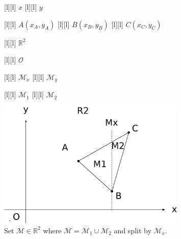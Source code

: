 \begin{figure}[ht!]
	\centering
	\footnotesize

	[l] {$x$}
	[l] {$y$}

	[l] {$A(x_A,y_A)$}
	[l] {$B(x_B,y_B)$}
	[l] {$C(x_C,y_C)$}

	[l] {$\mathbb{R}^2$}

	[l] {$\mathcal{O}$}

	[l] {$\mathcal{M}_x$}
	[l] {$\mathcal{M}_y$}

	[l] {$\mathcal{M}_1$}
	[l] {$\mathcal{M}_2$}

	\includegraphics[width=0.8\textwidth]{setAinR2_Ax.eps}
	\caption{Set $\mathcal{M} \in \mathbb{R}^2$ where
		$\mathcal{M} = \mathcal{M}_{1} \cup \mathcal{M}_{2}$
		and split by $\mathcal{M}_x$.}
	\label{\LABEL}
\end{figure}
